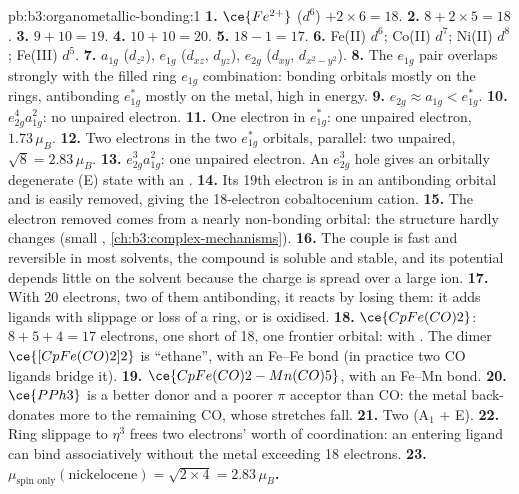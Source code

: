 \begin{solution}{pb:b3:organometallic-bonding:1}
\textbf{1.} $\ce{Fe^{2+}}$ ($d^6$) $+ 2 \times 6 = 18$.
\textbf{2.} $8 + 2 \times 5 = 18$.
\textbf{3.} $9 + 10 = 19$.
\textbf{4.} $10 + 10 = 20$.
\textbf{5.} $18 - 1 = 17$.
\textbf{6.} Fe(II) $d^6$; Co(II) $d^7$; Ni(II) $d^8$; Fe(III) $d^5$.
\textbf{7.} $a_{1g}$ ($d_{z^2}$), $e_{1g}$ ($d_{xz}$, $d_{yz}$), $e_{2g}$ ($d_{xy}$, $d_{x^2-y^2}$).
\textbf{8.} The $e_{1g}$ pair overlaps strongly with the filled ring $e_{1g}$ combination: bonding
orbitals mostly on the rings, antibonding $e_{1g}^\ast$ mostly on the metal, high in
energy.
\textbf{9.} $e_{2g} \approx a_{1g} < e_{1g}^\ast$.
\textbf{10.} $e_{2g}^4a_{1g}^2$: no unpaired electron.
\textbf{11.} One electron in $e_{1g}^\ast$: one unpaired electron, $1.73\,\mu_B$.
\textbf{12.} Two electrons in the two $e_{1g}^\ast$ orbitals, parallel: two unpaired, $\sqrt{8} =
2.83\,\mu_B$.
\textbf{13.} $e_{2g}^3a_{1g}^2$: one unpaired electron. An $e_{2g}^3$ hole gives an orbitally degenerate
(E) state with an .
\textbf{14.} Its 19th electron is in an antibonding orbital and is easily removed,
giving the 18-electron cobaltocenium cation.
\textbf{15.} The electron removed comes from a nearly non-bonding orbital: the
structure hardly changes (small , \cref{ch:b3:complex-mechanisms}).
\textbf{16.} The couple is fast and reversible in most solvents, the compound is
soluble and stable, and its potential depends little on the solvent because the
charge is spread over a large ion.
\textbf{17.} With 20 electrons, two of them antibonding, it reacts by losing them: it
adds ligands with slippage or loss of a ring, or is oxidised.
\textbf{18.} $\ce{CpFe(CO)2}$: $8 + 5 + 4 = 17$ electrons, one short of 18, one frontier orbital: 
with . The dimer $\ce{[CpFe(CO)2]2}$ is ``ethane'', with an Fe--Fe bond (in practice two CO
ligands bridge it).
\textbf{19.} $\ce{CpFe(CO)2-Mn(CO)5}$, with an Fe--Mn bond.
\textbf{20.} $\ce{PPh3}$ is a better donor and a poorer $\pi$ acceptor than CO: the metal back-donates
more to the remaining CO, whose stretches fall.
\textbf{21.} Two (A$_1$ + E).
\textbf{22.} Ring slippage to $\eta^3$ frees two electrons' worth of coordination: an entering
ligand can bind associatively without the metal exceeding 18 electrons.
\textbf{23.} \textbf{$\mu_{\text{spin only}}(\text{nickelocene}) = \sqrt{2 \times 4} = 2.83\,\mu_B$.}
\end{solution}
